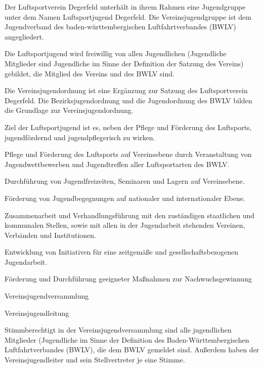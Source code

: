 \documentclass[10pt,a4paper,parskip=half]{scrartcl}
\begin{document}
\begin{contract}
    

    Der Luftsportverein Degerfeld unterhält in ihrem Rahmen eine Jugendgruppe unter dem Namen Luftsportjugend Degerfeld. Die Vereinsjugendgruppe ist dem Jugendverband des baden-württembergischen Luftfahrtverbandes (BWLV) angegliedert.
    
    Die Luftsportjugend wird freiwillig von allen Jugendlichen (Jugendliche Mitglieder sind Jugendliche im Sinne der Definition der Satzung des Vereins) gebildet, die Mitglied des Vereins und des BWLV sind.
    
    Die Vereinsjugendordnung ist eine Ergänzung zur Satzung des Luftsportverein Degerfeld. Die Bezirksjugendordnung und die Jugendordnung des BWLV bilden die Grundlage zur Vereinsjugendordnung.

    Ziel der Luftsportjugend ist es, neben der Pflege und Förderung des Luftsports, jugendfördernd und jugendpflegerisch zu wirken.


    Pflege und Förderung des Luftsports auf Vereinsebene durch Veranstaltung von Jugendwettbewerben und Jugendtreffen aller Luftsportarten des BWLV.

    Durchführung von Jugendfreizeiten, Seminaren und Lagern auf Vereinsebene.

    Förderung von Jugendbegegnungen auf nationaler und internationaler Ebene.

    Zusammenarbeit und Verhandlungsführung mit den zuständigen staatlichen und kommunalen Stellen, sowie mit allen in der Jugendarbeit stehenden Vereinen, Verbänden und Institutionen.
    
    Entwicklung von Initiativen für eine zeitgemäße und gesellschaftsbezogenen Jugendarbeit.

    Förderung und Durchführung geeigneter Maßnahmen zur Nachwuchsgewinnung


    Vereinsjugendversammlung

    Vereinsjugendleitung


    Stimmberechtigt in der Vereinsjugendversammlung sind alle jugendlichen Mitglieder (Jugendliche im Sinne der Definition des Baden-Württembergischen Luftfahrtverbandes (BWLV), die dem BWLV gemeldet sind. Außerdem haben der Vereinsjugendleiter und sein Stellvertreter je eine Stimme.


\end{contract}
\end{document}
